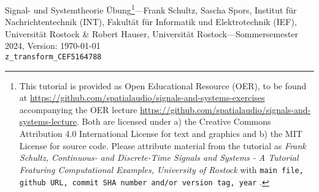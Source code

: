 \documentclass[11pt,a4paper,DIV=12]{scrartcl}
\begin{document}
%
\noindent Signal- und Systemtheorie Übung\footnote{This tutorial is provided as
Open Educational Resource (OER), to be found at
\url{https://github.com/spatialaudio/signals-and-systems-exercises}
accompanying the OER lecture
\url{https://github.com/spatialaudio/signals-and-systems-lecture}.
%
Both are licensed under a) the Creative Commons Attribution 4.0 International
License for text and graphics and b) the MIT License for source code.
%
Please attribute material from the tutorial as \textit{Frank Schultz,
Continuous- and Discrete-Time Signals and Systems - A Tutorial Featuring
Computational Examples, University of Rostock} with
\texttt{main file, github URL, commit SHA number and/or version tag, year}
.}---Frank Schultz, Sascha Spors,
Institut für Nachrichtentechnik (INT),
Fakultät für Informatik und Elektrotechnik (IEF),
Universität Rostock \&
Robert Hauser, Universität Rostock---Sommersemester 2024, Version: \today\\
\verb|z_transform_CEF5164788|

\tableofcontents

\newpage
\end{document}
